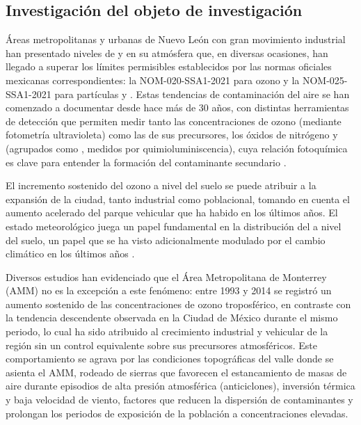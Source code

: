 
\subsection{Investigación del objeto de investigación}
\label{sec:investigacion-obj}

Áreas metropolitanas y urbanas de Nuevo León con gran movimiento industrial han
presentado niveles de  y  en su atmósfera que, en diversas
ocasiones, han llegado a superar los límites permisibles establecidos por las
normas oficiales mexicanas correspondientes: la NOM-020-SSA1-2021 para ozono
\parencite{nom020ssa1} y la NOM-025-SSA1-2021 para partículas  y
 \parencite{nom025ssa1}. Estas tendencias de contaminación del aire se
han comenzado a documentar desde hace más de 30 años, con distintas herramientas
de detección que permiten medir tanto las concentraciones de ozono (mediante
fotometría ultravioleta) como las de sus precursores, los óxidos de nitrógeno
 y  (agrupados como , medidos por quimioluminiscencia),
cuya relación fotoquímica es clave para entender la formación del contaminante
secundario  \parencite{SanfordSillman}.

El incremento sostenido del ozono a nivel del suelo se puede atribuir a la
expansión de la ciudad, tanto industrial como poblacional, tomando en cuenta el
aumento acelerado del parque vehicular que ha habido en los últimos años. El
estado meteorológico juega un papel fundamental en la distribución del  a
nivel del suelo, un papel que se ha visto adicionalmente modulado por el cambio
climático en los últimos años \parencite{atmos15070779}.

Diversos estudios han evidenciado que el Área Metropolitana de Monterrey (AMM)
no es la excepción a este fenómeno: entre 1993 y 2014 se registró un aumento
sostenido de las concentraciones de ozono troposférico, en contraste con la
tendencia descendente observada en la Ciudad de México durante el mismo periodo,
lo cual ha sido atribuido al crecimiento industrial y vehicular de la región sin
un control equivalente sobre sus precursores atmosféricos. Este comportamiento
se agrava por las condiciones topográficas del valle donde se asienta el AMM,
rodeado de sierras que favorecen el estancamiento de masas de aire durante
episodios de alta presión atmosférica (anticiclones), inversión térmica y baja
velocidad de viento, factores que reducen la dispersión de contaminantes y
prolongan los periodos de exposición de la población a concentraciones elevadas.

